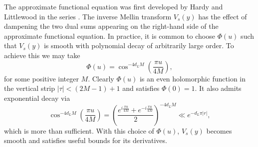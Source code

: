 \documentclass[12pt]{article}
\begin{document}
    The approximate functional equation was first developed by Hardy and Littlewood in the series \cite{hardyzeros1921,hardyapproximate1923,hardyapproximate1929}. The inverse Mellin transform \(V_{s}(y)\) has the effect of dampening the two dual sums appearing on the right-hand side of the approximate functional equation. In practice, it is common to choose \(\Phi(u)\) such that \(V_{s}(y)\) is smooth with polynomial decay of arbitrarily large order. To achieve this we may take
    \[
      \Phi(u) = \cos^{-4d_{L}M}\left(\frac{\pi u}{4M}\right),
    \]
    for some positive integer \(M\). Clearly \(\Phi(u)\) is an even holomorphic function in the vertical strip \(|\tau| < (2M-1)+1\) and satisfies \(\Phi(0) = 1\). It also admits exponential decay via
    \begin{equation}\label{equ:choice_for_V_decay_estimate}
     \cos^{-4d_{L}M}\left(\frac{\pi u}{4M}\right) = \left(\frac{e^{i\frac{\pi u}{4M}}+e^{-i\frac{\pi u}{4M}}}{2}\right)^{-4d_{L}M} \ll e^{-d_{L}\pi|r|},
    \end{equation}
    which is more than sufficient. With this choice of \(\Phi(u)\), \(V_{s}(y)\) becomes smooth and satisfies useful bounds for its derivatives.
\end{document}
